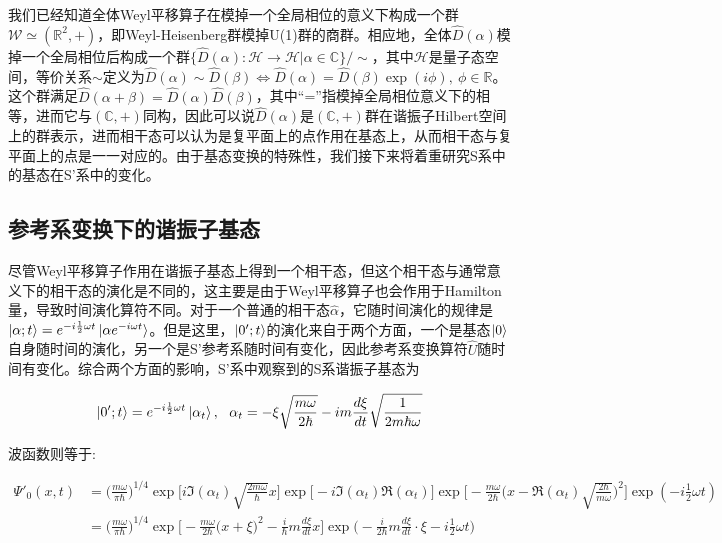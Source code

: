\documentclass[a4paper]{article}
\begin{document}
        我们已经知道全体Weyl平移算子在模掉一个全局相位的意义下构成一个群$\mathcal{W}\simeq(\mathbb{R}^2,+)$，即Weyl-Heisenberg群模掉U(1)群的商群。相应地，全体$\hat{D}(\alpha)$模掉一个全局相位后构成一个群$\{\hat{D}(\alpha):\mathcal{H}\to\mathcal{H}|\alpha\in\mathbb{C}\}/\sim$，其中$\mathcal{H}$是量子态空间，等价关系$\sim$定义为$\hat{D}(\alpha)\sim\hat{D}(\beta) \Leftrightarrow \hat{D}(\alpha)=\hat{D}(\beta)\exp(i\phi),\ \phi\in\mathbb{R}$。这个群满足$\hat{D}(\alpha+\beta)=\hat{D}(\alpha)\hat{D}(\beta)$，其中“=”指模掉全局相位意义下的相等，进而它与$(\mathbb{C},+)$同构，因此可以说$\hat{D}(\alpha)$是$(\mathbb{C},+)$群在谐振子Hilbert空间上的群表示，进而相干态可以认为是复平面上的点作用在基态上，从而相干态与复平面上的点是一一对应的。由于基态变换的特殊性，我们接下来将着重研究S系中的基态在S'系中的变化。

    \subsection{参考系变换下的谐振子基态}

        尽管Weyl平移算子作用在谐振子基态上得到一个相干态，但这个相干态与通常意义下的相干态的演化是不同的，这主要是由于Weyl平移算子也会作用于Hamilton量，导致时间演化算符不同。对于一个普通的相干态$\hat{\alpha}$，它随时间演化的规律是$\ket{\alpha;t}=e^{-i\frac{1}{2}\omega t}\ket{\alpha e^{-i\omega t}}$。但是这里，$\ket{0';t}$的演化来自于两个方面，一个是基态$\ket{0}$自身随时间的演化，另一个是S'参考系随时间有变化，因此参考系变换算符$\hat{U}$随时间有变化。综合两个方面的影响，S'系中观察到的S系谐振子基态为

        \begin{equation}
            \ket{0';t} = e^{-i\frac{1}{2}\omega t}\ket{\alpha_t}, \ \ \alpha_t=-\xi\sqrt{\frac{m\omega}{2\hbar}}-im\frac{d\xi}{dt}\sqrt{\frac{1}{2m\hbar\omega}}
        \end{equation}

        波函数则等于:

        \begin{equation}
            \begin{split}   
                \Psi'_0(x,t) &= \bigg(\frac{m\omega}{\pi\hbar}\bigg)^{1/4} \exp\biggl[i\Im(\alpha_t)\sqrt{\frac{2m\omega}{\hbar}}x\biggr] \exp\biggl[-i\Im(\alpha_t)\Re(\alpha_t)\biggr] \exp\biggl[-\frac{m\omega}{2\hbar} \bigl(x-\Re(\alpha_t)\sqrt{\frac{2\hbar}{m\omega}}\bigr)^2 \biggr] \exp(-i\frac{1}{2}\omega t) \\
                    &= \bigg(\frac{m\omega}{\pi\hbar}\bigg)^{1/4} \exp\biggl[-\frac{m\omega}{2\hbar} \bigl(x+\xi\bigr)^2-\frac{i}{\hbar}m\frac{d\xi}{dt}x\biggr] \exp\biggl(-\frac{i}{2\hbar}m\frac{d\xi}{dt}\cdot\xi-i\frac{1}{2}\omega t \biggr)
            \end{split}
        \end{equation}
\end{document}
